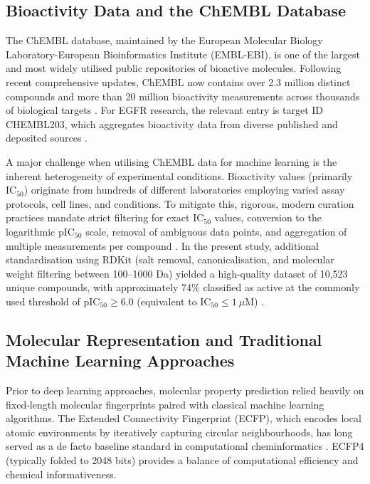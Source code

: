 \subsection{Bioactivity Data and the ChEMBL Database}

The ChEMBL database, maintained by the European Molecular Biology Laboratory-European Bioinformatics Institute (EMBL-EBI), is one of the largest and most widely utilised public repositories of bioactive molecules. Following recent comprehensive updates, ChEMBL now contains over 2.3 million distinct compounds and more than 20 million bioactivity measurements across thousands of biological targets \parencite{Zdraziletal2024}. For EGFR research, the relevant entry is target ID CHEMBL203, which aggregates bioactivity data from diverse published and deposited sources \parencite{Zdraziletal2024}.

A major challenge when utilising ChEMBL data for machine learning is the inherent heterogeneity of experimental conditions. Bioactivity values (primarily IC$_{50}$) originate from hundreds of different laboratories employing varied assay protocols, cell lines, and conditions. To mitigate this, rigorous, modern curation practices mandate strict filtering for exact IC$_{50}$ values, conversion to the logarithmic pIC$_{50}$ scale, removal of ambiguous data points, and aggregation of multiple measurements per compound \parencite{Huangetal2021}. In the present study, additional standardisation using RDKit (salt removal, canonicalisation, and molecular weight filtering between 100--1000 Da) yielded a high-quality dataset of 10,523 unique compounds, with approximately 74\% classified as active at the commonly used threshold of pIC$_{50} \geq 6.0$ (equivalent to IC$_{50} \leq 1~\mu$M) \parencite{Huangetal2021, Maliketal2025}.

\subsection{Molecular Representation and Traditional Machine Learning Approaches}

Prior to deep learning approaches, molecular property prediction relied heavily on fixed-length molecular fingerprints paired with classical machine learning algorithms. The Extended Connectivity Fingerprint (ECFP), which encodes local atomic environments by iteratively capturing circular neighbourhoods, has long served as a de facto baseline standard in computational cheminformatics \parencite{Dengetal2022}. ECFP4 (typically folded to 2048 bits) provides a balance of computational efficiency and chemical informativeness.

